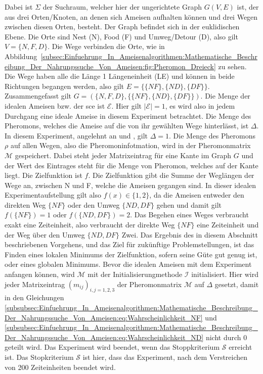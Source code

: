 \documentclass[fontsize=12, a4aper]{scrartcl}
\begin{document}
	Dabei ist \(\Sigma\) der Suchraum, welcher hier der ungerichtete Graph \(G(V,E)\) ist, der aus drei Orten/Knoten, an denen sich Ameisen aufhalten können und drei Wegen zwischen diesen Orten, besteht. Der Graph befindet sich in der euklidischen Ebene. Die Orte sind Nest (N), Food (F) und Umweg/Detour (D), also gilt \(V = \{N, F, D\}\). Die Wege verbinden die Orte, wie in Abbildung~\ref{subsec:Einfuehrung_In_Ameisenalgorithmen:Mathematische_Beschreibung_Der_Nahrungssuche_Von_Ameisen:fig:Pheromon_Dreieck} zu sehen. Die Wege haben alle die Länge 1 Längeneinheit (LE) und können in beide Richtungen begangen werden, also gilt \(E = \{\{NF\}, \{ND\}, \{DF\}\}\). Zusammengefasst gilt \(G = (\{N, F, D\}, \{\{NF\}, \{ND\}, \{DF\}\})\). Die Menge der idealen Ameisen bzw. der \ac{sce} ist \(\mathcal{E}\). Hier gilt \(|\mathcal{E}| = 1\), es wird also in jedem Durchgang eine ideale Ameise in diesem Experiment betrachtet. Die Menge des Pheromons, welches die Ameise auf die von ihr gewählten Wege hinterlässt, ist \(\Delta\). In diesem Experiment, angelehnt an \cite{bonabeau1999swarm} und \cite{christian2008swarm}, gilt \(\Delta = 1\). Die Menge des Pheromons \(\rho\) auf allen Wegen, also die Pheromoninfotmation, wird in der Pheromonmatrix \(\mathcal{M}\) gespeichert. Dabei steht jeder Matrixeintrag für eine Kante im Graph \(G\) und der Wert des Eintrages steht für die Menge von Pheromon, welches auf der Kante liegt. Die Zielfunktion ist \(f\). Die Zielfunktion gibt die Summe der Weglängen der Wege an, zwischen N und F, welche die Ameisen gegangen sind. In dieser idealen Experimentaufstellung gilt also \(f(x) \in \{1, 2\}\), da die Ameisen entweder den direkten Weg \(\{NF\}\) oder den Umweg \(\{ND, DF\}\) gehen und damit gilt \(f(\{NF\}) = 1\) oder \(f(\{ND, DF\}) = 2\). Das Begehen eines Weges verbraucht exakt eine Zeiteinheit, also verbraucht der direkte Weg \(\{NF\}\) eine Zeiteinheit und der Weg über den Umweg \(\{ND, DF\}\) Zwei. Das Ergebnis des in diesem Abschnitt beschriebenen Vorgehens, und das Ziel für zukünftige Problemstellungen, ist das Finden eines lokalen Minimums der Zielfunktion, sofern seine Güte gut genug ist, oder eines globalen Minimums. Bevor die idealen Ameisen mit dem Experiment anfangen können, wird \(\mathcal{M}\) mit der Initialisierungmethode \(\mathcal{I}\) initialisiert. Hier wird jeder Matrixeintrag \((m_{ij})_{i, j = 1, 2, 3}\) der Pheromonmatrix \(\mathcal{M}\) auf \(\Delta\) gesetzt, damit in den Gleichungen \ref{subsubsec:Einfuehrung_In_Ameisenalgorithmen:Mathematische_Beschreibung_Der_Nahrungssuche_Von_Ameisen:eq:Wahrscheinlichkeit_NF} und \ref{subsubsec:Einfuehrung_In_Ameisenalgorithmen:Mathematische_Beschreibung_Der_Nahrungssuche_Von_Ameisen:eq:Wahrscheinlichkeit_ND} nicht durch 0 geteilt wird. Das Experiment wird beendet, wenn das Stoppkriterium \(\mathcal{S}\) erreicht ist. Das Stopkriterium \(\mathcal{S}\) ist hier, dass das Experiment, nach dem Verstreichen von 200 Zeiteinheiten beendet wird.
	
\end{document}
